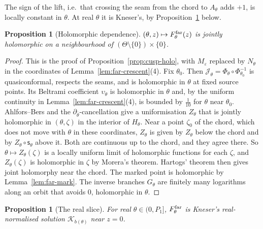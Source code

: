 \documentclass[11pt]{amsart}
\newtheorem{proposition}[theorem]{Proposition}
\theoremstyle{definition}
\begin{document}
The sign of the lift, i.e.\ that crossing the seam from the chord to $A_\theta$ adds
$+1$, is locally constant in $\theta$.  At real $\theta$ it is Kneser's, by
Proposition~\ref{prop:far-real} below.

\begin{proposition}[Holomorphic dependence]\label{prop:far-holo}
$(\theta,z)\mapsto F^{\rm far}_\theta(z)$ is jointly holomorphic on a neighbourhood of
$(\Theta\setminus\{0\})\times\{0\}$.
\end{proposition}

\begin{proof}
This is the proof of Proposition~\ref{prop:cusp-holo}, with $M_\varepsilon$ replaced by
$N_\theta$ in the coordinates of Lemma~\ref{lem:far-crescent}(4).  Fix $\theta_0$.  Then
$\mathcal J_\theta=\Phi_\theta\circ\Phi_{\theta_0}^{-1}$ is quasiconformal, respects the seams, and is holomorphic in $\theta$
at fixed source points.  Its Beltrami coefficient $\upsilon_\theta$ is holomorphic in $\theta$ and, by
the uniform continuity in Lemma~\ref{lem:far-crescent}(4), is bounded by $\tfrac1{10}$
for $\theta$ near $\theta_0$.  Ahlfors--Bers and the $\partial_{\bar\theta}$-cancellation give a
uniformisation $Z_\theta$ that is jointly holomorphic in $(\theta,\zeta)$ in the interior of
$H_\theta$.  Near a point $\zeta_0$ of the chord, which does not move with $\theta$ in these
coordinates, $Z_\theta$ is given by $Z_\theta$ below the chord and by $Z_\theta\circ \mathsf s_\theta$ above it.  Both
are continuous up to the chord, and they agree there.  So $\theta\mapsto Z_\theta(\zeta)$ is a locally
uniform limit of holomorphic functions for each $\zeta$, and $Z_\theta(\zeta)$ is holomorphic in
$\zeta$ by Morera's theorem.  Hartogs' theorem then gives joint holomorphy near the
chord.  The marked point is holomorphic
by Lemma~\ref{lem:far-mark}.  The inverse branches $G_\theta$ are finitely many
logarithms along an orbit that avoids $0$, holomorphic in $\theta$.
\end{proof}

\begin{proposition}[The real slice]\label{prop:far-real}
For real $\theta\in(0,P_1]$, $F^{\rm far}_\theta$ is Kneser's real-normalised solution $\mathcal K_{b(\theta)}$
near $z=0$.
\end{proposition}
\end{document}
